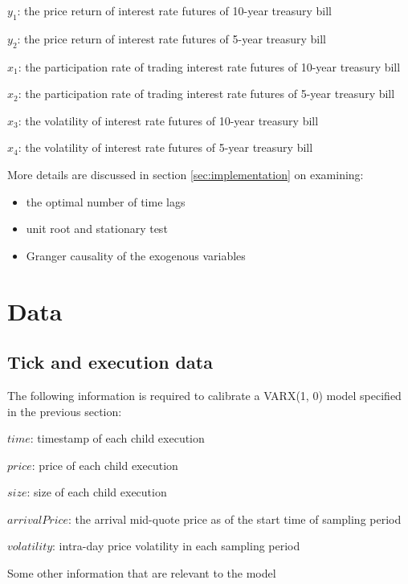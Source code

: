 \documentclass[a4paper]{article}
\begin{document}
\begin{description}
\item $y_1$: the price return of interest rate futures of 10-year treasury bill
\item $y_2$: the price return of interest rate futures of 5-year treasury bill
\item $x_1$: the participation rate of trading interest rate futures of 10-year treasury bill
\item $x_2$: the participation rate of trading interest rate futures of 5-year treasury bill
\item $x_3$: the volatility of interest rate futures of 10-year treasury bill
\item $x_4$: the volatility of interest rate futures of 5-year treasury bill
\end{description}


More details are discussed in section \ref{sec:implementation} on examining:
\begin{itemize}
\item the optimal number of time lags
\item unit root and stationary test
\item Granger causality of the exogenous variables
\end{itemize}

\section{Data}
\subsection{Tick and execution data}
The following information is required to calibrate a VARX(1, 0) model specified in the previous section:
\begin{description}
\item $time$: timestamp of each child execution
\item $price$: price of each child execution
\item $size$: size of each child execution
\item $arrivalPrice$: the arrival mid-quote price as of the start time of sampling period
\item $volatility$: intra-day price volatility in each sampling period
\item Some other information that are relevant to the model
\end{description}
\end{document}
